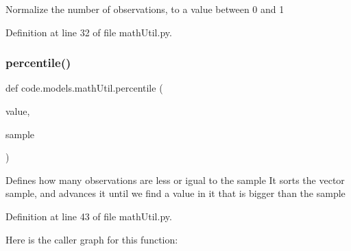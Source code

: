 \begin{DoxyVerb}Normalize the number of observations, to a value between 0 and 1\end{DoxyVerb}
 

Definition at line 32 of file math\+Util.\+py.

\mbox{\label{namespacecode_1_1models_1_1math_util_a2415ab497b8fa691c2755ca022d77c48}} 
\subsubsection{\texorpdfstring{percentile()}{percentile()}}
{\footnotesize\ttfamily def code.\+models.\+math\+Util.\+percentile (\begin{DoxyParamCaption}\item[{}]{value,  }\item[{}]{sample }\end{DoxyParamCaption})}

\begin{DoxyVerb}Defines how many observations are less or igual to the sample
    It sorts the vector sample, and advances it until we find a value in it that is bigger than the sample
\end{DoxyVerb}
 

Definition at line 43 of file math\+Util.\+py.

Here is the caller graph for this function\+:
